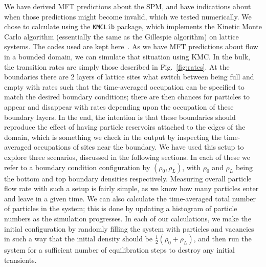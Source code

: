 \documentclass[
reprint,
 amsmath,amssymb,
 aps,
 prl,
]{revtex4-1}
\begin{document}
We have derived MFT predictions about the SPM, and have indications about when those predictions might become invalid, which we tested numerically.
We chose to calculate using the \texttt{KMCLib}\cite{leetmaa2014kmclib} package, which implements the Kinetic Monte Carlo algorithm
(essentially the same as the Gillespie algorithm\cite{Gillespie1977, Bortz1975, Prados1997})
on lattice systems. The codes used are kept here~\cite{jHellGitRepo}.
As we have MFT predictions about flow in a bounded domain, we can simulate that situation using KMC. In the bulk, the transition rates are simply those described in Fig.~\ref{fig:rates}. At the boundaries
there are 2 layers of lattice sites what switch between being full and empty with rates such that the time-averaged occupation can be specified to match the desired boundary conditions; there are then chances for particles to appear
and disappear with rates depending upon the occupation of these boundary layers. In the end, the intention is that these boundaries should reproduce the effect of having particle reservoirs attached to the edges of the domain,
which is something we check
in the output by inspecting the time-averaged occupations of sites near the boundary. We have used this setup to explore three scenarios, discussed in the following sections. In each of these we refer to a boundary condition configuration
by $(\rho_0, \rho_L)$, with $\rho_0$ and $\rho_L$ being the bottom and top boundary densities respectively.
Measuring overall particle flow rate with such a setup is fairly simple, as we know how many particles enter and leave in a given time.
We can also calculate the time-averaged total number of particles in the system; this is done by updating a histogram of particle numbers
as the simulation progresses. In each of our calculations, we make the initial configuration by randomly filling the system with particles and vacancies in such a way that the initial density should be $\frac{1}{2}(\rho_0 + \rho_L)$, and then
run the system for a sufficient number of equilibration steps to destroy any initial transients.
\end{document}
